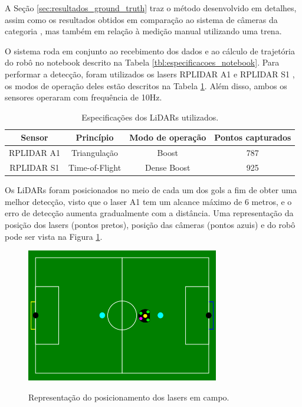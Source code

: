 \documentclass[acronym, symbols, table]{fei}
\begin{document}
	A Seção \ref{sec:resultados_ground_truth} traz o método desenvolvido em detalhes, assim como os resultados obtidos em comparação ao sistema de câmeras da categoria , mas também em relação à medição manual utilizando uma trena.
	
	O sistema roda em conjunto ao recebimento dos dados e ao cálculo de trajetória do robô no notebook descrito na Tabela \ref{tbl:especificacoes_notebook}. Para performar a detecção, foram utilizados os lasers RPLIDAR A1 \cite{rplidar_a1} e RPLIDAR S1 \cite{rplidar_s1}, os modos de operação deles estão descritos na Tabela \ref{tbl:especificacoes_laser}. Além disso, ambos os sensores operaram com frequência de 10Hz.
	
	\begin{table}[!htb]
		\centering
		\caption{Especificações dos LiDARs utilizados.}
		\label{tbl:especificacoes_laser}
		\begin{tabular}{|c|c|c|c|}
			\hline
			Sensor 				& Princípio 		& Modo de operação 	& Pontos capturados\\ \hline
			RPLIDAR A1			& Triangulação 		& Boost 			& 787 \\ \hline
			RPLIDAR S1 			& Time-of-Flight 	& Dense Boost		& 925 \\ \hline
		\end{tabular}
	\end{table}

	Os LiDARs foram posicionados no meio de cada um dos gols a fim de obter uma melhor detecção, visto que o laser A1 tem um alcance máximo de 6 metros, e o erro de detecção aumenta gradualmente com a distância. Uma representação da posição dos lasers (pontos pretos), posição das câmeras (pontos azuis) e do robô pode ser vista na Figura \ref{fig:representacao_teste_lidar}.
	
	\begin{figure}[!htb]
		\centering
		\caption{Representação do posicionamento dos lasers em campo.}
		\includegraphics[width=0.75\textwidth]{representacao_teste_lidar_cameras.png}
		\label{fig:representacao_teste_lidar}
	\end{figure}
	
\end{document}
